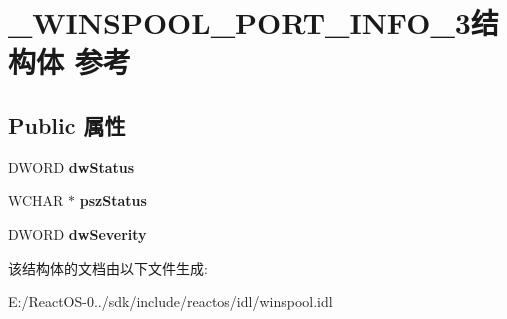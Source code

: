 \hypertarget{struct___w_i_n_s_p_o_o_l___p_o_r_t___i_n_f_o__3}{}\section{\+\_\+\+W\+I\+N\+S\+P\+O\+O\+L\+\_\+\+P\+O\+R\+T\+\_\+\+I\+N\+F\+O\+\_\+3结构体 参考}
\label{struct___w_i_n_s_p_o_o_l___p_o_r_t___i_n_f_o__3}
\subsection*{Public 属性}
\begin{DoxyCompactItemize}
\item 
\mbox{\label{struct___w_i_n_s_p_o_o_l___p_o_r_t___i_n_f_o__3_ace162cd35c445c6ce7d5f4f0f91b10d6}} 
D\+W\+O\+RD {\bfseries dw\+Status}
\item 
\mbox{\label{struct___w_i_n_s_p_o_o_l___p_o_r_t___i_n_f_o__3_a161199c3eabb0cc77213b3d47c86d18a}} 
W\+C\+H\+AR $\ast$ {\bfseries psz\+Status}
\item 
\mbox{\label{struct___w_i_n_s_p_o_o_l___p_o_r_t___i_n_f_o__3_a2fc82e610ade799ed7d066c72233fda7}} 
D\+W\+O\+RD {\bfseries dw\+Severity}
\end{DoxyCompactItemize}


该结构体的文档由以下文件生成\+:\begin{DoxyCompactItemize}
\item 
E\+:/\+React\+O\+S-\/0../sdk/include/reactos/idl/winspool.\+idl\end{DoxyCompactItemize}
